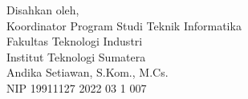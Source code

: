 \begin{center}
	\begin{center}
		\fontsize{10pt}{12pt}
		Disahkan oleh,\\
		Koordinator Program Studi Teknik Informatika\\
		Fakultas Teknologi Industri\\
		Institut Teknologi Sumatera
		\vspace{2cm}\\
		Andika Setiawan, S.Kom., M.Cs. \\ %
		NIP 19911127 2022 03 1 007 \\
	\end{center}

\end{center}
\clearpage
